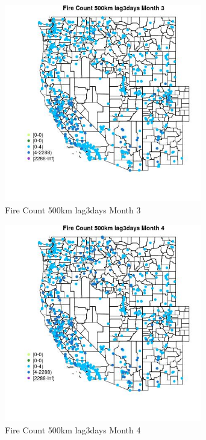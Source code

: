 \begin{figure} 
\centering  
\includegraphics[width=0.77\textwidth]{Code_Outputs/Report_ML_input_PM25_Step4_part_e_de_duplicated_aves_compiled_2019-05-21wNAs_MapObsMo3Fire_Count_500km_lag3days.jpg} 
\caption{\label{fig:Report_ML_input_PM25_Step4_part_e_de_duplicated_aves_compiled_2019-05-21wNAsMapObsMo3Fire_Count_500km_lag3days}Fire Count 500km lag3days Month 3} 
\end{figure} 
 

\begin{figure} 
\centering  
\includegraphics[width=0.77\textwidth]{Code_Outputs/Report_ML_input_PM25_Step4_part_e_de_duplicated_aves_compiled_2019-05-21wNAs_MapObsMo4Fire_Count_500km_lag3days.jpg} 
\caption{\label{fig:Report_ML_input_PM25_Step4_part_e_de_duplicated_aves_compiled_2019-05-21wNAsMapObsMo4Fire_Count_500km_lag3days}Fire Count 500km lag3days Month 4} 
\end{figure} 
 

